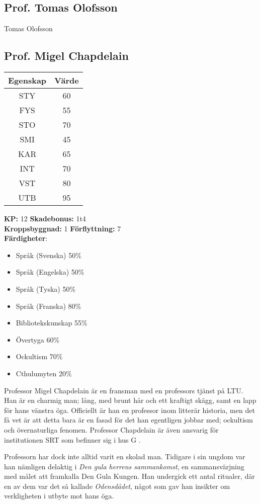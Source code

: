 \subsection{Prof. Tomas Olofsson}
\label{kar:TomasOlofsson}
Tomas Olofsson
%
\subsection{Prof. Migel Chapdelain}
\label{kar:MigelChapdelain}
\begin{center}
	\begin{tabular}{ | c | c | }
		\hline
		Egenskap & Värde \\
		\hline
		STY & 60 \\
		FYS & 55 \\
		STO & 70 \\
		SMI & 45 \\
		KAR & 65 \\
		INT & 70 \\
		VST & 80 \\
		UTB & 95 \\
		\hline
	\end{tabular}
\end{center}
%
\textbf{KP:} 12 \quad \textbf{Skadebonus:} 1t4 \\
\textbf{Kroppsbyggnad:} 1 \quad \textbf{Förflyttning:} 7
\\
\textbf{Färdigheter}:
\begin{itemize}
	\item Språk (Svenska) 50\%
	\item Språk (Engelska) 50\%
	\item Språk (Tyska) 50\%
	\item Språk (Franska) 80\%
	\item Bibliotekskunskap 55\%
	\item Övertyga 60\%
	\item Ockultism 70\%
	\item Cthulumyten 20\%
\end{itemize}
%
Professor Migel Chapdelain är en fransman med en professors tjänst på LTU. Han är en charmig man; lång, med brunt hår och ett kraftigt skägg, samt en lapp för hans vänstra öga. Officiellt är han en professor inom litterär historia, men det få vet är att detta bara är en fasad för det han egentligen jobbar med; ockultism och övernaturliga fenomen. Professor Chapdelain är även ansvarig för institutionen SRT som befinner sig i hus G \sectiondescribe{\ref{loc:SRT}}.

Professorn har dock inte alltid varit en skolad man. Tidigare i sin ungdom var han nämligen delaktig i \textit{Den gula herrens sammankomst}, en sammansvärjning med målet att framkalla Den Gula Kungen. Han undergick ett antal ritualer, där en av dem var det så kallade \textit{Odensdådet}, något som gav han insikter om verkligheten i utbyte mot hans öga.
